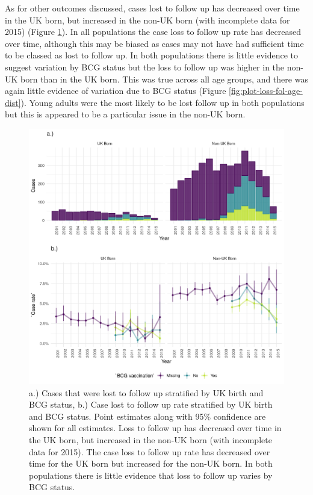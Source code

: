 \documentclass[11pt,twoside]{bristolthesis}
\begin{document}
  As for other outcomes discussed, cases lost to follow up has decreased over time in the UK born, but increased in the non-UK born (with incomplete data for 2015) (Figure \ref{fig:plot-loss-fol-case-rate}). In all populations the case loss to follow up rate has decreased over time, although this may be biased as cases may not have had sufficient time to be classed as lost to follow up. In both populations there is little evidence to suggest variation by BCG status but the loss to follow up was higher in the non-UK born than in the UK born. This was true across all age groups, and there was again little evidence of variation due to BCG status (Figure \ref{fig:plot-loss-fol-age-dist}). Young adults were the most likely to be lost follow up in both populations but this is appeared to be a particular issue in the non-UK born.
  \begin{figure}
  
  {\centering \includegraphics[width=0.8\linewidth]{chapters/tb-epi-england/figures/plot-loss-fol-case-rate} 
  
  }
  
  \caption{a.) Cases that were lost to follow up stratified by UK birth and BCG status, b.) Case lost to follow up rate stratified by UK birth and BCG status. Point estimates along with 95\% confidence are shown for all estimates. Loss to follow up has decreased over time in the UK born, but increased in the non-UK born (with incomplete data for 2015). The case loss to follow up rate has decreased over time for the UK born but increased for the non-UK born. In both populations there is little evidence that loss to follow up varies by BCG status.}\label{fig:plot-loss-fol-case-rate}
  \end{figure}
\end{document}
